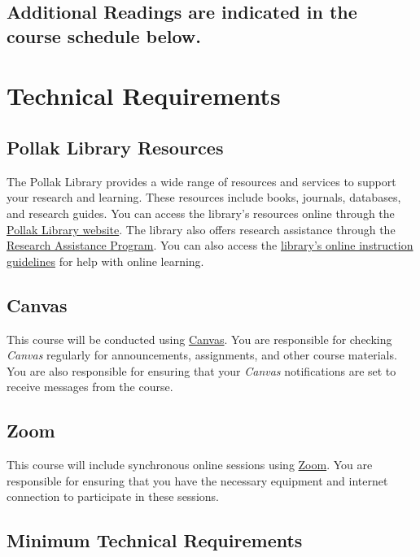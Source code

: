 \documentclass[12pt, letterpaper]{article}
\begin{document}
\subsection*{Additional Readings are indicated in the course schedule below.}

\section{Technical Requirements}

\subsection*{Pollak Library Resources}

The Pollak Library provides a wide range of resources and services to support your research and learning. These resources include books, journals, databases, and research guides. You can access the library's resources online through the \href{http://www.library.fullerton.edu/}{Pollak Library website}. The library also offers research assistance through the \href{http://www.library.fullerton.edu/research/}{Research Assistance Program}. You can also access the \href{http://www.library.fullerton.edu/about/guidelines/online-instruction-guidelines.php}{library's online instruction guidelines} for help with online learning.

\subsection*{Canvas}

This course will be conducted using \href{https://csufullerton.instructure.com/}{Canvas}. You are responsible for checking \emph{Canvas} regularly for announcements, assignments, and other course materials. You are also responsible for ensuring that your \emph{Canvas} notifications are set to receive messages from the course. 

\subsection*{Zoom}
This course will include synchronous online sessions using \href{https://fullerton.zoom.us/}{Zoom}. You are responsible for ensuring that you have the necessary equipment and internet connection to participate in these sessions. 

\subsection*{Minimum Technical Requirements}
\end{document}
